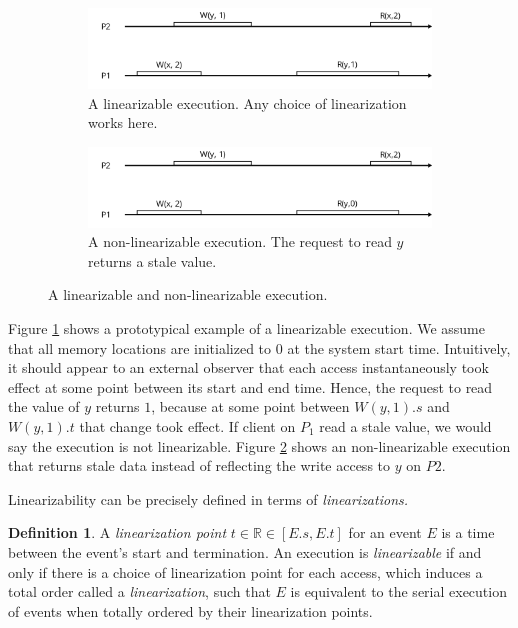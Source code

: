 \documentclass[]             %
{NASA}                       %
\theoremstyle{definition}
\newtheorem{definition}{Definition}[section]
\begin{document}
\begin{figure}\begin{subfigure}[a]{1\textwidth} \center
    \includegraphics[scale=0.4]{images/linear1.png} \caption{A
      linearizable execution. Any choice of linearization works here.}
    \label{fig:linear_example11} \end{subfigure}
  \begin{subfigure}[b]{1\textwidth} \center
    \includegraphics[scale=0.4]{images/nonlinear0.png} \caption{A
      non-linearizable execution. The request to read $y$ returns a
      stale value. } \label{fig:linear_example12} \end{subfigure}
  \caption{A linearizable and non-linearizable execution.}
  \label{fig:linear_example1} \end{figure}

Figure \ref{fig:linear_example11} shows a prototypical example of a
linearizable execution. We assume that all memory locations are
initialized to \(0\) at the system start time. Intuitively, it should
appear to an external observer that each access instantaneously took
effect at some point between its start and end time. Hence, the request
to read the value of \(y\) returns \(1\), because at some point between
\(W(y,1).s\) and \(W(y,1).t\) that change took effect. If client on
\(P_1\) read a stale value, we would say the execution is not
linearizable. Figure \ref{fig:linear_example12} shows an
non-linearizable execution that returns stale data instead of reflecting
the write access to \(y\) on \(P2\).

Linearizability can be precisely defined in terms of
\emph{linearizations.}

\begin{definition}
  A \emph{linearization point} $t \in \mathbb{R} \in [E.s, E.t]$ for an
  event $E$ is a time between the event's start and termination. An
  execution is \emph{linearizable} if and only if there is a choice of
  linearization point for each access, which induces a total order called a \emph{linearization},
  such that $E$ is equivalent to
  the serial execution of events when totally ordered by their
  linearization points.
\end{definition}
\end{document}
